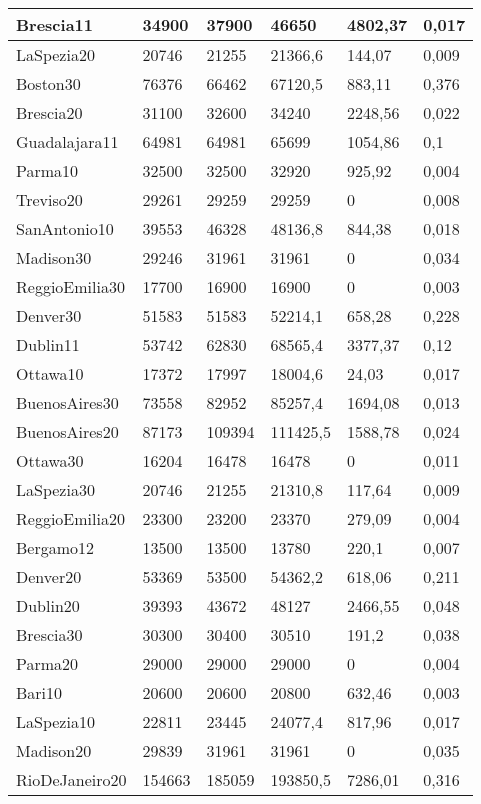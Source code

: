 \begin{longtable}[c]{|l|l|l|l|l|l|}
Brescia11 & 34900 & 37900 & 46650 & 4802,37 & 0,017 \\ \hline
LaSpezia20 & 20746 & 21255 & 21366,6 & 144,07 & 0,009 \\ \hline
Boston30 & 76376 & 66462 & 67120,5 & 883,11 & 0,376 \\ \hline
Brescia20 & 31100 & 32600 & 34240 & 2248,56 & 0,022 \\ \hline
Guadalajara11 & 64981 & 64981 & 65699 & 1054,86 & 0,1 \\ \hline
Parma10 & 32500 & 32500 & 32920 & 925,92 & 0,004 \\ \hline
Treviso20 & 29261 & 29259 & 29259 & 0 & 0,008 \\ \hline
SanAntonio10 & 39553 & 46328 & 48136,8 & 844,38 & 0,018 \\ \hline
Madison30 & 29246 & 31961 & 31961 & 0 & 0,034 \\ \hline
ReggioEmilia30 & 17700 & 16900 & 16900 & 0 & 0,003 \\ \hline
Denver30 & 51583 & 51583 & 52214,1 & 658,28 & 0,228 \\ \hline
Dublin11 & 53742 & 62830 & 68565,4 & 3377,37 & 0,12 \\ \hline
Ottawa10 & 17372 & 17997 & 18004,6 & 24,03 & 0,017 \\ \hline
BuenosAires30 & 73558 & 82952 & 85257,4 & 1694,08 & 0,013 \\ \hline
BuenosAires20 & 87173 & 109394 & 111425,5 & 1588,78 & 0,024 \\ \hline
Ottawa30 & 16204 & 16478 & 16478 & 0 & 0,011 \\ \hline
LaSpezia30 & 20746 & 21255 & 21310,8 & 117,64 & 0,009 \\ \hline
ReggioEmilia20 & 23300 & 23200 & 23370 & 279,09 & 0,004 \\ \hline
Bergamo12 & 13500 & 13500 & 13780 & 220,1 & 0,007 \\ \hline
Denver20 & 53369 & 53500 & 54362,2 & 618,06 & 0,211 \\ \hline
Dublin20 & 39393 & 43672 & 48127 & 2466,55 & 0,048 \\ \hline
Brescia30 & 30300 & 30400 & 30510 & 191,2 & 0,038 \\ \hline
Parma20 & 29000 & 29000 & 29000 & 0 & 0,004 \\ \hline
Bari10 & 20600 & 20600 & 20800 & 632,46 & 0,003 \\ \hline
LaSpezia10 & 22811 & 23445 & 24077,4 & 817,96 & 0,017 \\ \hline
Madison20 & 29839 & 31961 & 31961 & 0 & 0,035 \\ \hline
RioDeJaneiro20 & 154663 & 185059 & 193850,5 & 7286,01 & 0,316 \\ \hline
\end{longtable}